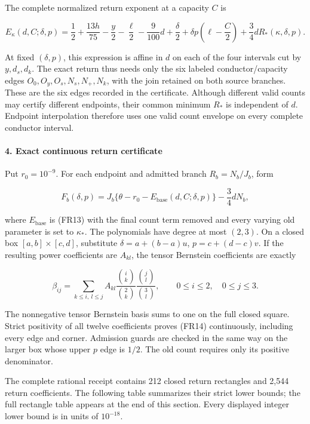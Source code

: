The complete normalized return exponent at a capacity \(C\) is

\[
E_\kappa(d,C;\delta,p)
=\frac12+\frac{13h}{75}-\frac y2-\frac\ell2-\frac9{100}d
 +\frac\delta2+\delta p\left(\ell-\frac C2\right)
 +\frac34dR_*(\kappa,\delta,p).
\tag{FR13}
\]

At fixed \((\delta,p)\), this expression is affine in \(d\) on each of the four intervals cut by \(y,d_s,d_k\). The exact return thus needs only the six labeled conductor/capacity edges \(O_0,O_y,O_s,N_s,N_+,N_k\), with the join retained on both source branches. These are the six edges recorded in the certificate. Although different valid counts may certify different endpoints, their common minimum \(R_*\) is independent of \(d\). Endpoint interpolation therefore uses one valid count envelope on every complete conductor interval.

\hypertarget{first-return:exact-continuous-return-certificate}{%
\paragraph{4. Exact continuous return certificate}\label{first-return:exact-continuous-return-certificate}}

Put \(r_0=10^{-9}\). For each endpoint and admitted branch \(R_b=N_b/J_b\), form

\[
F_b(\delta,p)
=J_b\{\theta-r_0-E_{\mathrm{base}}(d,C;\delta,p)\}
 -\frac34dN_b,
\tag{FR14}
\]

where \(E_{\mathrm{base}}\) is (FR13) with the final count term removed and every varying old parameter is set to \(\kappa_*\). The polynomials have degree at most \((2,3)\). On a closed box \([a,b]\times[c,d]\), substitute \(\delta=a+(b-a)u\), \(p=c+(d-c)v\). If the resulting power coefficients are \(A_{kl}\), the tensor Bernstein coefficients are exactly

\[
\beta_{ij}=\sum_{k\le i,\ l\le j}
A_{kl}\frac{\binom{i}{k}}{\binom{2}{k}}
       \frac{\binom{j}{l}}{\binom{3}{l}},\qquad
0\le i\le2,\quad0\le j\le3.
\tag{FR15}
\]

The nonnegative tensor Bernstein basis sums to one on the full closed square. Strict positivity of all twelve coefficients proves (FR14) continuously, including every edge and corner. Admission guards are checked in the same way on the larger box whose upper \(p\) edge is \(1/2\). The old count requires only its positive denominator.

The complete rational receipt contains 212 closed return rectangles and 2,544 return coefficients. The following table summarizes their strict lower bounds; the full rectangle table appears at the end of this section. Every displayed integer lower bound is in units of \(10^{-18}\).

